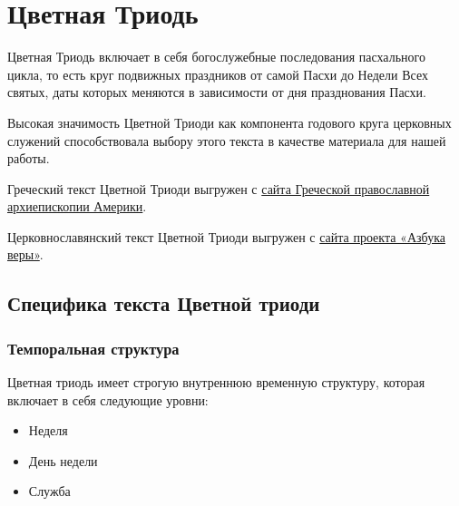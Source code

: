 \documentclass[
  letterpaper,
]{book}
\begin{document}
\hfill\break


\hypertarget{ux446ux432ux435ux442ux43dux430ux44f-ux442ux440ux438ux43eux434ux44c}{%
\chapter{Цветная
Триодь}\label{ux446ux432ux435ux442ux43dux430ux44f-ux442ux440ux438ux43eux434ux44c}}

Цветная Триодь включает в себя богослужебные последования пасхального
цикла, то есть круг подвижных праздников от самой Пасхи до Недели Всех
святых, даты которых меняются в зависимости от дня празднования Пасхи.

Высокая значимость Цветной Триоди как компонента годового круга
церковных служений способствовала выбору этого текста в качестве
материала для нашей работы.

Греческий текст Цветной Триоди выгружен с
\href{https://glt.goarch.org/\#04}{сайта Греческой православной
архиепископии Америки}.

Церковнославянский текст Цветной Триоди выгружен с
\href{https://azbyka.ru/otechnik/Pravoslavnoe_Bogosluzhenie/triod-tsvetnaja/}{сайта
проекта «Азбука веры»}.

\hypertarget{ux441ux43fux435ux446ux438ux444ux438ux43aux430-ux442ux435ux43aux441ux442ux430-ux446ux432ux435ux442ux43dux43eux439-ux442ux440ux438ux43eux434ux438}{%
\section{\texorpdfstring{\textbf{Специфика текста Цветной
триоди}}{Специфика текста Цветной триоди}}\label{ux441ux43fux435ux446ux438ux444ux438ux43aux430-ux442ux435ux43aux441ux442ux430-ux446ux432ux435ux442ux43dux43eux439-ux442ux440ux438ux43eux434ux438}}

\hypertarget{ux442ux435ux43cux43fux43eux440ux430ux43bux44cux43dux430ux44f-ux441ux442ux440ux443ux43aux442ux443ux440ux430}{%
\subsection{Темпоральная
структура}\label{ux442ux435ux43cux43fux43eux440ux430ux43bux44cux43dux430ux44f-ux441ux442ux440ux443ux43aux442ux443ux440ux430}}

Цветная триодь имеет строгую внутреннюю временную структуру, которая
включает в себя следующие уровни:

\begin{itemize}
\item
  Неделя
\item
  День недели
\item
  Служба
\end{itemize}
\end{document}
